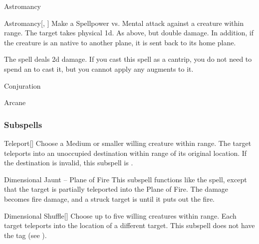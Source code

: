 \newpage
\begin{spellsection}{Astromancy}

\begin{spellheader}
\end{spellheader}


\begin{ability}{Astromancy}[, ]
Make a Spellpower vs. Mental attack against a creature within \rngmed range.
\hit The target takes physical  \plus1d.
\crit As above, but double damage.
In addition, if the creature is an  native to another plane, it is sent back to its home plane.
\end{ability}



 The spell deals \minus2d damage. If you cast this spell as a cantrip,
you do not need to spend an  to cast it,
but you cannot apply any augments to it.


 Conjuration

 Arcane
\end{spellsection}


\subsubsection{Subspells}


\begin{ability}[\nth{1}]{Teleport}[]
Choose a Medium or smaller willing creature within \rngclose range.
The target teleports into an unoccupied destination within \rngmed range of its original location.
If the destination is invalid, this subspell is .
\end{ability}
\vspace{0.25em}


\begin{ability}[\nth{2}]{Dimensional Jaunt -- Plane of Fire}
This subspell functions like the  spell, except that the target is partially teleported into the Plane of Fire.
The damage becomes fire damage, and a struck target is  until it puts out the fire.
\end{ability}
\vspace{0.25em}


\begin{ability}[\nth{2}]{Dimensional Shuffle}[]
Choose up to five willing creatures within \rngmed range.
Each target teleports into the location of a different target.
This subspell does not have the  tag (see ).
\end{ability}
\vspace{0.25em}


